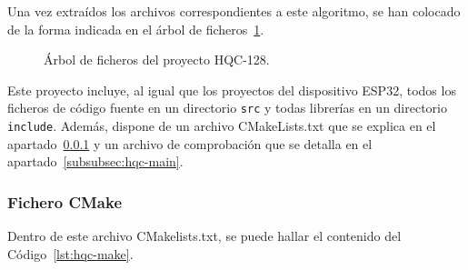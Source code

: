 Una vez extraídos los archivos correspondientes a este algoritmo, se han colocado de la forma indicada en el árbol de ficheros~\ref{tree:hqc}.

\begin{figure}[H]
\centering
{}
\caption{Árbol de ficheros del proyecto HQC-128.}
\label{tree:hqc}
\end{figure}

Este proyecto incluye, al igual que los proyectos del dispositivo ESP32, todos los ficheros de código fuente en un directorio \texttt{src} y todas librerías en un directorio \texttt{include}.
Además, dispone de un archivo CMakeLists.txt que se explica en el apartado~\ref{subsubsec:hqc-cmake} y un archivo de comprobación que se detalla en el apartado~\ref{subsubsec:hqc-main}.


\subsubsection{Fichero CMake}\label{subsubsec:hqc-cmake}

Dentro de este archivo CMakelists.txt, se puede hallar el contenido del Código~\ref{lst:hqc-make}.

